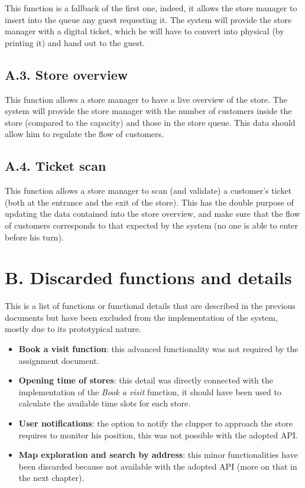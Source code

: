 This function is a fallback of the first one, indeed, it allows the store manager to insert into the queue any guest requesting it.
The system will provide the store manager with a digital ticket, which he will have to convert into physical (by printing it) and hand out to the guest.

\subsection{A.3. Store overview}

This function allows a store manager to have a live overview of the store.
The system will provide the store manager with the number of customers inside the store (compared to the capacity) and those in the store queue.
This data should allow him to regulate the flow of customers.

\subsection{A.4. Ticket scan}

This function allows a store manager to scan (and validate) a customer’s ticket (both at the entrance and the exit of the store).
This has the double purpose of updating the data contained into the store overview, and make sure that the flow of customers corresponds to that expected by the system (no one is able to enter before his turn).

\section{B. Discarded functions and details}

This is a list of functions or functional details that are described in the previous documents but have been excluded from the implementation of the system, mostly due to its prototypical nature.

\begin{itemize}
  \item \textbf{Book a visit function}: this advanced functionality was not required by the assignment document.
  \item \textbf{Opening time of stores}: this detail was directly connected with the implementation of the \emph{Book a visit} function, it should have been used to calculate the available time slots for each store.
  \item \textbf{User notifications}: the option to notify the clupper to approach the store requires to monitor his position, this was not possible with the adopted API.
  \item \textbf{Map exploration and search by address}: this minor functionalities have been discarded because not available with the adopted API (more on that in the next chapter).
\end{itemize}


